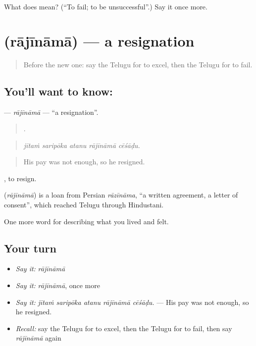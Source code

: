 \begin{tcolorbox}[breakable,colback=teal!4,colframe=teal!35!black,title={Before you move on}]
What does  mean? (\textquotedblleft{}To fail; to be unsuccessful\textquotedblright{}.) Say it once more.
\end{tcolorbox}
\section[\texorpdfstring{\te{రాజీనామా} (rājīnāmā)}{రాజీనామా (rājīnāmā)}]{ (rājīnāmā) — a resignation}

\label{lesson:TE-C527-rajinama}



\begin{quote}
Before the new one: say the Telugu for to excel, then the Telugu for to fail.
\end{quote}

\subsection*{You'll want to know: }
\textbf{} — \emph{rājīnāmā} — \textquotedblleft{}a resignation\textquotedblright{}.

\begin{quote}
    .
\end{quote}

\begin{quote}
\emph{jītaṁ saripōka atanu rājīnāmā cēśāḍu.}
\end{quote}

\begin{quote}
His pay was not enough, so he resigned.
\end{quote}

 , to resign.

\begin{cousinweb}
\textbf{} (\emph{rājīnāmā}) is a loan from Persian \emph{rāzīnāma}, \textquotedblleft{}a written agreement, a letter of consent\textquotedblright{}, which reached Telugu through Hindustani.
\end{cousinweb}

\begin{grammarlens}[title={What you've built}]
One more word for describing what you lived and felt.
\end{grammarlens}

\subsection*{Your turn}
\begin{itemize}
\raggedright
  \item \emph{Say it:} \emph{rājīnāmā}
  \item \emph{Say it:} \emph{rājīnāmā}, once more
  \item \emph{Say it:} \emph{jītaṁ saripōka atanu rājīnāmā cēśāḍu.} — His pay was not enough, so he resigned.
  \item \emph{Recall:} say the Telugu for to excel, then the Telugu for to fail, then say \emph{rājīnāmā} again
\end{itemize}

